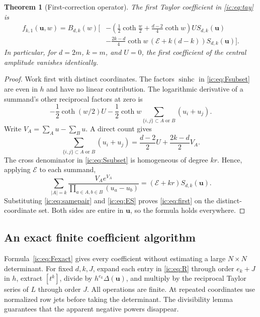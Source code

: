 \documentclass[11pt,a4paper]{article}
\numberwithin{equation}{section}
\newtheorem{theorem}{Theorem}[section]
\theoremstyle{definition}
\theoremstyle{remark}
\newcommand{\Del}{\Delta}
\newcommand{\bu}{\boldsymbol u}
\newcommand{\sinhc}{\operatorname{sinhc}}
\newcommand{\EE}{\mathcal E}
\begin{document}
\begin{theorem}[First-correction operator]\label{ic:thm:first}
The first Taylor coefficient in \eqref{ic:eq:tay} is
\begin{equation}\label{ic:eq:first}
\begin{split}
 f_{k,1}(\bu,w)=B_{d,k}(w)\bigg[&
 -\left(\frac12\coth\frac w2+\frac{d-2}{4}\coth w\right)
     U S_{d,k}(\bu)\\
 &-\frac{2k-d}{4}\coth w\,
          (\EE+k(d-k))S_{d,k}(\bu)\bigg].
\end{split}
\end{equation}
In particular, for $d=2m$, $k=m$, and $U=0$, the first coefficient of the
central amplitude vanishes identically.
\end{theorem}
\begin{proof}
Work first with distinct coordinates. The factors $\sinhc$ in
\eqref{ic:eq:Fsubset} are even in $h$ and have no linear contribution. The
logarithmic derivative of a summand's other reciprocal factors at zero
is
\[
 -\frac12\coth(w/2)U
 -\frac12\coth w
   \sum_{\{i,j\}\subset A\text{ or }B}(u_i+u_j).
\]
Write $V_A=\sum_Au-\sum_Bu$. A direct count gives
\begin{equation}\label{ic:eq:samepair}
 \sum_{\{i,j\}\subset A\text{ or }B}(u_i+u_j)
 =\frac{d-2}{2}U+\frac{2k-d}{2}V_A.
\end{equation}
The cross denominator in \eqref{ic:eq:Ssubset} is homogeneous of degree
$kr$. Hence, applying $\EE$ to each summand,
\begin{equation}\label{ic:eq:ES}
 \sum_{|A|=k}\frac{V_Ae^{V_A}}
 {\prod_{a\in A,b\in B}(u_a-u_b)}
 =(\EE+kr)S_{d,k}(\bu).
\end{equation}
Substituting \eqref{ic:eq:samepair} and \eqref{ic:eq:ES} proves
\eqref{ic:eq:first} on the distinct-coordinate set. Both sides are entire
in $\bu$, so the formula holds everywhere.
\end{proof}

\subsection{An exact finite coefficient algorithm}
Formula~\eqref{ic:eq:Fexact} gives every coefficient without estimating a
large $N\times N$ determinant. For fixed $d,k,J$, expand each entry in
\eqref{ic:eq:R} through order $e_k+J$ in $h$, extract $[t^k]$, divide by
$h^{e_k}\Del(\bu)$, and multiply by the reciprocal Taylor series of
$L$ through order $J$. All operations are finite. At repeated coordinates
use normalized row jets before taking the determinant. The divisibility
lemma guarantees that the apparent negative powers disappear.
\end{document}
